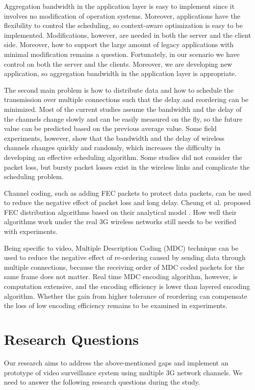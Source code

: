 \documentclass{article}
\begin{document}
    Aggregation bandwidth in the application layer \cite{qureshi:tavarua}
    is easy to implement since it involves no modification of operation systems.
    Moreover, applications have the flexibility to control
    the scheduling, so context-aware optimization is easy to be implemented. 
    Modifications, however,  are needed in both the server and the 
    client side. Moreover, how to support the large amount of 
    legacy applications with minimal modification remains a question. 
    Fortunately, in our scenario we have control on both the server and the 
    clients. Moreover, we are developing new application, so aggregation
    bandwidth in the application layer is appropriate.

    The second main problem is how to distribute data and how
    to schedule the transmission over multiple connections
    such that the delay and reordering can be minimized.
    Most of the current studies assume the bandwidth and the
    delay of the channels change slowly and can be easily measured
    on the fly, 
    so the future value can be predicted
    based on the previous average value. 
    Some field experiments, however, show that the bandwidth
    and the delay of wireless channels changes quickly and 
    randomly, which increases the difficulty in developing
    an effective scheduling algorithm.
    Some studies did not consider the packet loss, but 
    bursty packet losses exist in the wireless links and 
    complicate the scheduling problem.

    Channel coding, such as adding FEC packets to protect
    data packets, can be used to reduce the negative effect
    of packet loss and long delay. 
	Cheung et al. proposed FEC distribution algorithms 
	based on their analytical model \cite{cheung:smart}.
    How well their algorithms work under the real 
    3G wireless networks still needs to be verified
    with experiments.

	Being specific to video, 
    Multiple Description Coding (MDC) technique can be used
    to reduce the negative effect of re-ordering caused by 
	sending data through multiple connections, because
    the receiving order of MDC coded packets
    for the same frame does not matter.
    Real time MDC encoding algorithm, however, is computation extensive, 
    and the encoding efficiency is lower than layered encoding
    algorithm. Whether the gain from higher tolerance of reordering
    can compensate the loss of low encoding efficiency
    remains to be examined in experiments.
\section{Research Questions}
    Our research aims to address the above-mentioned gaps and
    implement an prototype of video surveillance system using
    multiple 3G network channels. We need to answer the following
    research questions during the study. 
\end{document}
